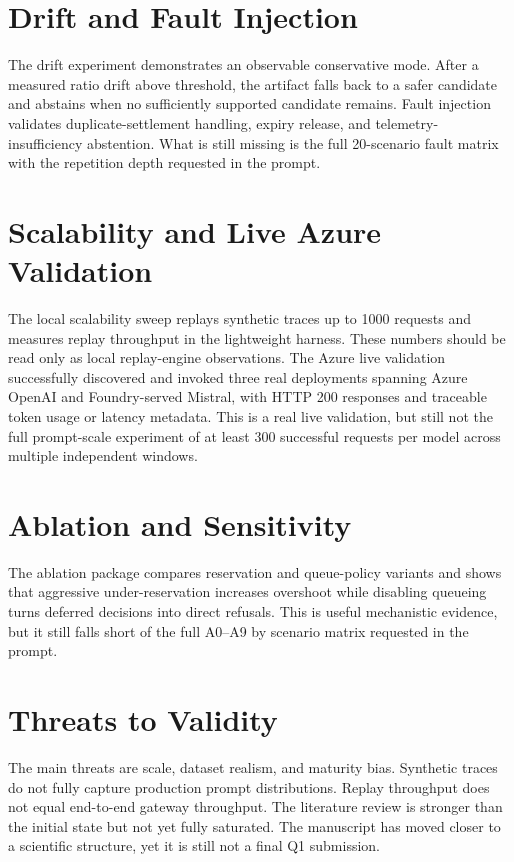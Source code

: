\documentclass[10pt,journal,compsoc]{IEEEtran}
\begin{document}
\section{Drift and Fault Injection}
The drift experiment demonstrates an observable conservative mode. After a
measured ratio drift above threshold, the artifact falls back to a safer
candidate and abstains when no sufficiently supported candidate remains. Fault
injection validates duplicate-settlement handling, expiry release, and
telemetry-insufficiency abstention. What is still missing is the full
20-scenario fault matrix with the repetition depth requested in the prompt.

\section{Scalability and Live Azure Validation}
The local scalability sweep replays synthetic traces up to 1000 requests and
measures replay throughput in the lightweight harness. These numbers should be
read only as local replay-engine observations. The Azure live validation
successfully discovered and invoked three real deployments spanning Azure
OpenAI and Foundry-served Mistral, with HTTP 200 responses and traceable token
usage or latency metadata. This is a real live validation, but still not the
full prompt-scale experiment of at least 300 successful requests per model
across multiple independent windows.

\section{Ablation and Sensitivity}
The ablation package compares reservation and queue-policy variants and shows
that aggressive under-reservation increases overshoot while disabling queueing
turns deferred decisions into direct refusals. This is useful mechanistic
evidence, but it still falls short of the full A0--A9 by scenario matrix
requested in the prompt.

\section{Threats to Validity}
The main threats are scale, dataset realism, and maturity bias. Synthetic
traces do not fully capture production prompt distributions. Replay throughput
does not equal end-to-end gateway throughput. The literature review is stronger
than the initial state but not yet fully saturated. The manuscript has moved
closer to a scientific structure, yet it is still not a final Q1 submission.
\end{document}
